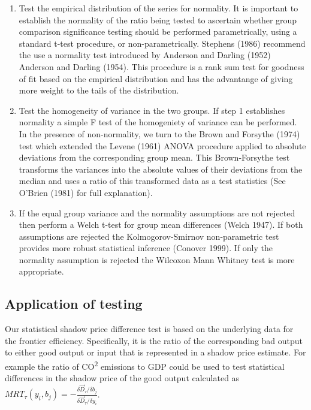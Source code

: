 \documentclass[
  10pt,
]{article}
\begin{document}
\begin{enumerate}
\def\labelenumi{\arabic{enumi}.}
\item
  Test the empirical distribution of the series for normality. It is
  important to establish the normality of the ratio being tested to
  ascertain whether group comparison significance testing should be
  performed parametrically, using a standard t-test procedure, or
  non-parametrically. Stephens (1986) recommend the use a normality test
  introduced by Anderson and Darling (1952) Anderson and Darling (1954).
  This procedure is a rank sum test for goodness of fit based on the
  empirical distribution and has the advantange of giving more weight to
  the tails of the distribution.
\item
  Test the homogeneity of variance in the two groups. If step 1
  establishes normality a simple F test of the homogeniety of variance
  can be performed. In the presence of non-normality, we turn to the
  Brown and Forsythe (1974) test which extended the Levene (1961) ANOVA
  procedure applied to absolute deviations from the corresponding group
  mean. This Brown-Forsythe test transforms the variances into the
  absolute values of their deviations from the median and uses a ratio
  of this transformed data as a test statistics (See O'Brien (1981) for
  full explanation).
\item
  If the equal group variance and the normality assumptions are not
  rejected then perform a Welch t-test for group mean differences (Welch
  1947). If both assumptions are rejected the Kolmogorov-Smirnov
  non-parametric test provides more robust statistical inference
  (Conover 1999). If only the normality assumption is rejected the
  Wilcoxon Mann Whitney test is more appropriate.
\end{enumerate}

\hypertarget{application-of-testing}{%
\subsection{Application of testing}\label{application-of-testing}}

Our statistical shadow price difference test is based on the underlying
data for the frontier efficiency. Specifically, it is the ratio of the
corresponding bad output to either good output or input that is
represented in a shadow price estimate. For example the ratio of
CO\textsuperscript{2} emissions to GDP could be used to test statistical
differences in the shadow price of the good output calculated as
\(MRT_{\tau}(y_{i},b_{j})=-\frac{\delta \vec{D}_{\tau}/\delta b_{j}}{\delta \vec{D}_{\tau}/\delta y_{i}}\).
\end{document}
